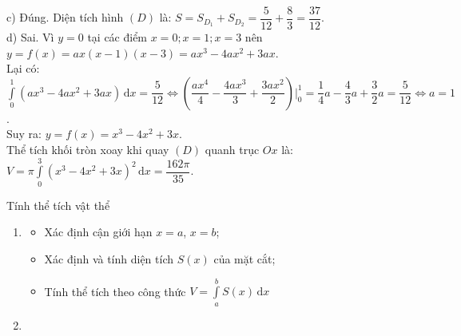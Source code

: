 \begin{ex}
{		c) Đúng. Diện tích hình $(D)$ là: $S=S_{D_1}+S_{D_2}=\dfrac{5}{12}+\dfrac{8}{3}=\dfrac{37}{12}$.\\
		d) Sai. Vì $y=0$ tại các điểm $x=0; x=1; x=3$ nên $y=f(x)=ax(x-1)(x-3)=ax^3-4ax^2+3ax$.\\
		Lại có: $\int\limits_0^1(ax^3-4ax^2+3ax)\mathrm{\, d}x=\dfrac{5}{12}\Leftrightarrow \left(\dfrac{ax^4}{4}-\dfrac{4ax^3}{3}+\dfrac{3ax^2}{2}\right)\bigg|_0^1=\dfrac{1}{4}a-\dfrac{4}{3}a+\dfrac{3}{2}a=\dfrac{5}{12}\Leftrightarrow a=1$.\\
		Suy ra: $y=f(x)=x^3-4x^2+3x$.\\
		Thể tích khối tròn xoay khi quay $(D)$ quanh trục $Ox$ là: $V=\pi\int\limits_0^3 \left(x^3-4x^2+3x\right)^2\mathrm{\, d}x=\dfrac{162\pi}{35}$. 
	}
\end{ex}
\begin{dang}{Tính thể tích vật thể}
	\begin{enumerate}[\iconMT]
		\item {}
		\begin{itemize}
			\item [\ding{172}] Xác định cận giới hạn $x=a$, $x=b$;
			\item [\ding{173}] Xác định và tính diện tích $S(x)$ của mặt cắt;
			\item [\ding{174}] Tính thể tích theo công thức $V=\displaystyle\int\limits_a^bS(x) \mathrm{\,d}x$
		\end{itemize}
		\item {}
\end{enumerate}
\end{dang}
